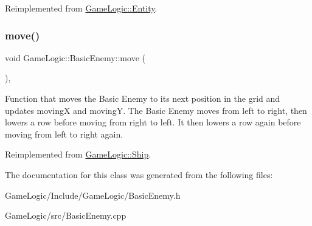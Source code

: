 Reimplemented from \hyperlink{classGameLogic_1_1Entity_af3461a4c6321b1af250821d7a1329ba7}{Game\+Logic\+::\+Entity}.

\mbox{\label{classGameLogic_1_1BasicEnemy_a8c51b862c94953e5455c04c2227b6d73}} 
\subsubsection{\texorpdfstring{move()}{move()}}
{\footnotesize\ttfamily void Game\+Logic\+::\+Basic\+Enemy\+::move (\begin{DoxyParamCaption}{ }\end{DoxyParamCaption})\hspace{0.3cm}{\ttfamily [override]}, {\ttfamily [virtual]}}

Function that moves the Basic Enemy to it\textquotesingle{}s next position in the grid and updates movingX and movingY. The Basic Enemy moves from left to right, then lowers a row before moving from right to left. It then lowers a row again before moving from left to right again. 

Reimplemented from \hyperlink{classGameLogic_1_1Ship_aaab731578b80b9e1920e3f2af2bc2f8c}{Game\+Logic\+::\+Ship}.



The documentation for this class was generated from the following files\+:\begin{DoxyCompactItemize}
\item 
Game\+Logic/\+Include/\+Game\+Logic/Basic\+Enemy.\+h\item 
Game\+Logic/src/Basic\+Enemy.\+cpp\end{DoxyCompactItemize}

